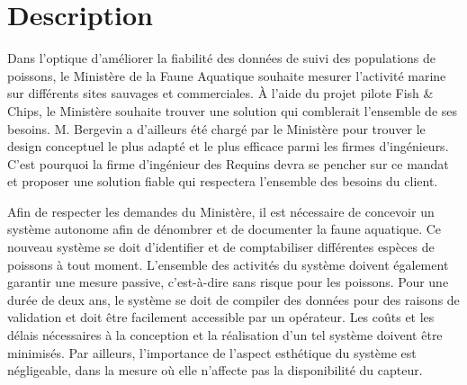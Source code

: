 
%
%

\chapter{Description}
\label{s:structure_rapport}

Dans l’optique d’améliorer la fiabilité des données de suivi des populations de poissons, le Ministère de la Faune Aquatique souhaite mesurer l’activité marine sur différents sites sauvages et commerciales. À l’aide du projet pilote Fish \& Chips, le Ministère souhaite trouver une solution qui comblerait l’ensemble de ses besoins. M. Bergevin a d’ailleurs été chargé par le Ministère pour trouver le design conceptuel le plus adapté et le plus efficace parmi les firmes d’ingénieurs. C’est pourquoi la firme d'ingénieur des Requins devra se pencher sur ce mandat et proposer une solution fiable qui respectera l'ensemble des besoins du client.

Afin de respecter les demandes du Ministère, il est nécessaire de concevoir un système autonome afin de dénombrer et de documenter la faune aquatique. Ce nouveau système se doit d’identifier et de comptabiliser différentes espèces de poissons à tout moment. L'ensemble des activités du système doivent également garantir une mesure passive, c'est-à-dire sans risque pour les poissons. Pour une durée de deux ans, le système se doit de compiler des données pour des raisons de validation et doit être facilement accessible par un opérateur. Les coûts et les délais nécessaires à la conception et la réalisation d'un tel système doivent être minimisés. Par ailleurs, l'importance de l'aspect esthétique du système est négligeable, dans la mesure où elle n'affecte pas la disponibilité du capteur.
